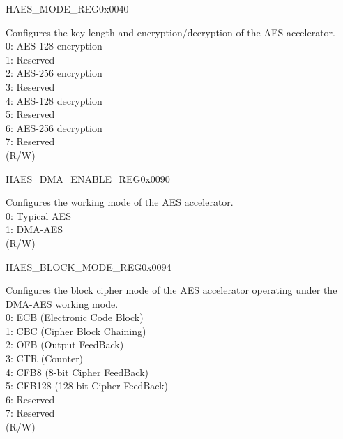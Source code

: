 \begin{register}{H}{AES\_MODE\_REG}{0x0040}\label{regdesc:AESMODEREG}
%
%
\regnewline%
\begin{regdesc}\begin{reglist}
\item [AES\_MODE] Configures the key length and encryption/decryption of the AES accelerator.\\
0: AES-128 encryption\\
1: Reserved\\
2: AES-256 encryption\\
3: Reserved\\
4: AES-128 decryption\\
5: Reserved\\
6: AES-256 decryption\\
7: Reserved\\
(R/W)
\end{reglist}\end{regdesc}
\end{register}


\begin{register}{H}{AES\_DMA\_ENABLE\_REG}{0x0090}\label{regdesc:AESDMAENABLEREG}
%
%
\regnewline%
\begin{regdesc}\begin{reglist}
\item [AES\_DMA\_ENABLE] Configures the working mode of the AES accelerator. \\
0: Typical AES\\
1: DMA-AES\\
(R/W) 
\end{reglist}\end{regdesc}
\end{register}


\begin{register}{H}{AES\_BLOCK\_MODE\_REG}{0x0094}\label{regdesc:AESBLOCKMODEREG}
%
%
\regnewline%
\begin{regdesc}\begin{reglist}
\item [AES\_BLOCK\_MODE] Configures the block cipher mode of the AES accelerator operating under the DMA-AES working mode. \\
0: ECB (Electronic Code Block)\\
1: CBC (Cipher Block Chaining)\\
2: OFB (Output FeedBack)\\
3: CTR (Counter)\\
4: CFB8 (8-bit Cipher FeedBack)\\
5: CFB128 (128-bit Cipher FeedBack)\\
6: Reserved\\
7: Reserved\\
(R/W)
\end{reglist}\end{regdesc}
\end{register}


